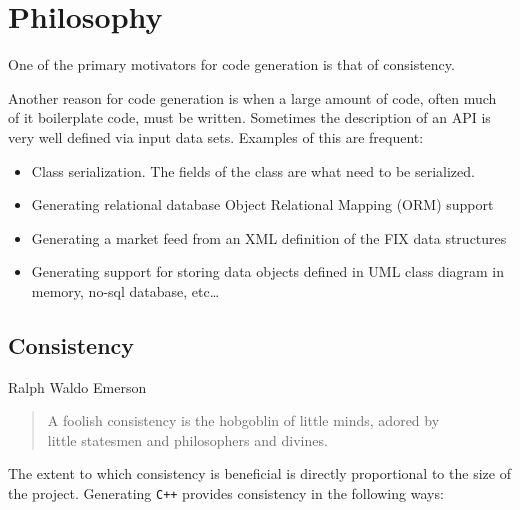 \documentclass[11pt]{article}
\begin{document}
\section{Philosophy}
\label{sec-4}


  One of the primary motivators for code generation is that of
  consistency.

  Another reason for code generation is when a large amount of code,
  often much of it boilerplate code, must be written. Sometimes the
  description of an API is very well defined via input data
  sets. Examples of this are frequent:
\begin{itemize}
\item Class serialization. The fields of the class are what need to be
    serialized.
\item Generating relational database Object Relational Mapping (ORM)
    support
\item Generating a market feed from an XML definition of the FIX data
    structures
\item Generating support for storing data objects defined in UML class
    diagram in memory, no-sql database, etc\ldots{}
\end{itemize}
\subsection{Consistency}
\label{sec-4.1}


  Ralph Waldo Emerson
\begin{verse}
A foolish consistency is the hobgoblin of little minds, adored by\\
little statesmen and philosophers and divines.\\
\end{verse}

  The extent to which consistency is beneficial is directly
  proportional to the size of the project. Generating \texttt{C++} provides
  consistency in the following ways:
\end{document}
